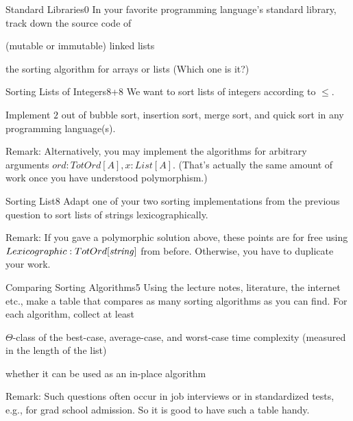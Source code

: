 \documentclass[a4paper]{article}
\begin{document}
\header

\begin{problem}{Standard Libraries}{0}
In your favorite programming language's standard library, track down the source code of
\begin{compactitem}
 \item (mutable or immutable) linked lists
 \item the sorting algorithm for arrays or lists (Which one is it?)
\end{compactitem}
\end{problem}

\begin{problem}{Sorting Lists of Integers}{8+8}
We want to sort lists of integers according to $\leq$.

Implement $2$ out of bubble sort, insertion sort, merge sort, and quick sort in any programming language(s).
\medskip

Remark: Alternatively, you may implement the algorithms for arbitrary arguments $ord:TotOrd[A], x:List[A]$.
(That's actually the same amount of work once you have understood polymorphism.)
\end{problem}

\begin{problem}{Sorting List}{8}
Adapt one of your two sorting implementations from the previous question to sort lists of strings lexicographically.
\medskip

Remark: If you gave a polymorphic solution above, these points are for free using $Lexicographic:TotOrd[\mathit{string}]$ from before.
Otherwise, you have to duplicate your work.
\end{problem}

\begin{problem}{Comparing Sorting Algorithms}{5}
Using the lecture notes, literature, the internet etc., make a table that compares as many sorting algorithms as you can find.
For each algorithm, collect at least
\begin{compactitem}
 \item $\Theta$-class of the best-case, average-case, and worst-case time complexity (measured in the length of the list)
 \item whether it can be used as an in-place algorithm
\end{compactitem}
\medskip

Remark: Such questions often occur in job interviews or in standardized tests, e.g., for grad school admission.
So it is good to have such a table handy.
\end{problem}
\end{document}
